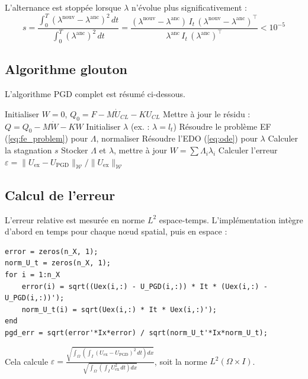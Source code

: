 \documentclass[11pt,a4paper]{article}
\begin{document}
L'alternance est stoppée lorsque $\lambda$ n'évolue plus significativement :
\begin{equation}
    s = \frac{\int_0^T (\lambda^{\text{nouv}} - \lambda^{\text{anc}})^2\,dt}
    {\int_0^T (\lambda^{\text{anc}})^2\,dt}
    = \frac{(\lambda^{\text{nouv}}-\lambda^{\text{anc}})\,I_t\,
    (\lambda^{\text{nouv}}-\lambda^{\text{anc}})^\top}
    {\lambda^{\text{anc}}\,I_t\,(\lambda^{\text{anc}})^\top} < 10^{-5}
\end{equation}

\subsection{Algorithme glouton}

L'algorithme PGD complet est résumé ci-dessous.

\begin{algorithm}[H]
\caption{PGD Glouton (sans mise à jour)}
\begin{algorithmic}[1]
\State Initialiser $W = 0$, $Q_0 = F - M\dot{U}_{CL} - KU_{CL}$
    \State Mettre à jour le résidu : $Q = Q_0 - M\dot{W} - KW$
    \State Initialiser $\lambda$ (ex. : $\lambda = l_t$)
        \State Résoudre le problème EF (\ref{eq:fe_problem}) pour $\Lambda$, normaliser
        \State Résoudre l'EDO (\ref{eq:ode}) pour $\lambda$
        \State Calculer la stagnation $s$
    \EndWhile
    \State Stocker $\Lambda$ et $\lambda$, mettre à jour $W = \sum \Lambda_i \lambda_i$
    \State Calculer l'erreur $\varepsilon = \|U_{\text{ex}} - U_{\text{PGD}}\|_\mathcal{W}
    / \|U_{\text{ex}}\|_\mathcal{W}$
\EndFor
\end{algorithmic}
\end{algorithm}

\subsection{Calcul de l'erreur}

L'erreur relative est mesurée en norme $L^2$ espace-temps.
L'implémentation intègre d'abord en temps pour chaque nœud spatial, puis en espace :
\begin{lstlisting}
error = zeros(n_X, 1);
norm_U_t = zeros(n_X, 1);
for i = 1:n_X
    error(i) = sqrt((Uex(i,:) - U_PGD(i,:)) * It * (Uex(i,:) - U_PGD(i,:))');
    norm_U_t(i) = sqrt(Uex(i,:) * It * Uex(i,:)');
end
pgd_err = sqrt(error'*Ix*error) / sqrt(norm_U_t'*Ix*norm_U_t);
\end{lstlisting}
Cela calcule
$\varepsilon = \frac{\sqrt{\int_\Omega \left(\int_I (U_{\text{ex}} - U_{\text{PGD}})^2\,dt\right)dx}}
{\sqrt{\int_\Omega \left(\int_I U_{\text{ex}}^2\,dt\right)dx}}$,
soit la norme $L^2(\Omega \times I)$.
\end{document}
